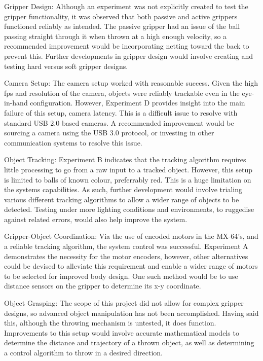 \documentclass[conference]{IEEEtran}
\begin{document}
Gripper Design:
Although an experiment was not explicitly created to test the gripper functionality, it was observed that both passive and active grippers functioned reliably as intended. The passive gripper had an issue of the ball passing straight through it when thrown at a high enough velocity, so a recommended improvement would be incorporating netting toward the back to prevent this.
Further developments in gripper design would involve creating and testing hard versus soft gripper designs.

Camera Setup:
The camera setup worked with reasonable success. Given the high fps and resolution of the camera, objects were reliably trackable even in the eye-in-hand configuration. However, Experiment D provides insight into the main failure of this setup, camera latency. This is a difficult issue to resolve with standard USB 2.0 based cameras. A recommended improvement would be sourcing a camera using the USB 3.0 protocol, or investing in other communication systems to resolve this issue.

Object Tracking:
Experiment B indicates that the tracking algorithm requires little processing to go from a raw input to a tracked object. However, this setup is limited to balls of known colour, preferrably red. This is a huge limitation on the systems capabilities. As such, further development would involve trialing various different tracking algorithms to allow a wider range of objects to be detected. Testing under more lighting conditions and environments, to ruggedise against related errors, would also help improve the system.

Gripper-Object Coordination:
Via the use of encoded motors in the MX-64's, and a reliable tracking algorithm, the system control was successful. Experiment A demonstrates the necessity for the motor encoders, however, other alternatives could be devised to alleviate this requirement and enable a wider range of motors to be selected for improved body design. One such method would be to use distance sensors on the gripper to determine its x-y coordinate.

Object Grasping:
The scope of this project did not allow for complex gripper designs, so advanced object manipulation has not been accomplished. Having said this, although the throwing mechanism is untested, it does function. Improvements to this setup would involve accurate mathematical models to determine the distance and trajectory of a thrown object, as well as determining a control algorithm to throw in a desired direction.
		
\end{document}
